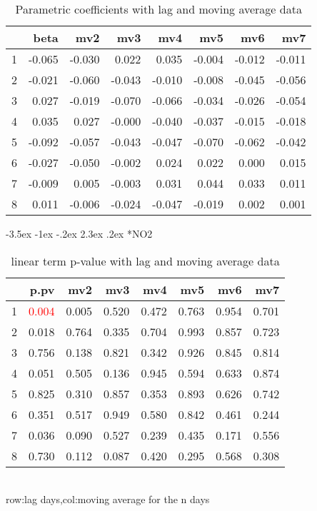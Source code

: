 \documentclass[a4paper, 12pt]{article}
\makeatletter
\def\large{\fontsize{14}{20}\selectfont}
\renewcommand\subsection{\@startsection {subsection}{1}{\z@}%
                                   {-3.5ex \@plus -1ex \@minus -.2ex}%
                                   {2.3ex \@plus.2ex}%
                                   {\centering\normalfont\large\bfseries}}
\makeatother
\begin{document}
\begin{table}[h]
\centering
\caption{Parametric coefficients with lag and moving average data}
\begin{tabular}{rrrrrrrr}
  \hline
 & beta & mv2 & mv3 & mv4 & mv5 & mv6 & mv7 \\
  \hline
1 & -0.065 & -0.030 & 0.022 & 0.035 & -0.004 & -0.012 & -0.011 \\
  2 & -0.021 & -0.060 & -0.043 & -0.010 & -0.008 & -0.045 & -0.056 \\
  3 & 0.027 & -0.019 & -0.070 & -0.066 & -0.034 & -0.026 & -0.054 \\
  4 & 0.035 & 0.027 & -0.000 & -0.040 & -0.037 & -0.015 & -0.018 \\
  5 & -0.092 & -0.057 & -0.043 & -0.047 & -0.070 & -0.062 & -0.042 \\
  6 & -0.027 & -0.050 & -0.002 & 0.024 & 0.022 & 0.000 & 0.015 \\
  7 & -0.009 & 0.005 & -0.003 & 0.031 & 0.044 & 0.033 & 0.011 \\
  8 & 0.011 & -0.006 & -0.024 & -0.047 & -0.019 & 0.002 & 0.001 \\
   \hline
\end{tabular}
\end{table}
\clearpage
\subsection*{NO2}
\begin{table}[h]
\centering
\caption{linear term p-value with lag and moving average data}
\begin{tabular}{rrrrrrrr}
  \hline
 & p.pv & mv2 & mv3 & mv4 & mv5 & mv6 & mv7 \\
  \hline
1 & \textcolor{red}{0.004} & 0.005 & 0.520 & 0.472 & 0.763 & 0.954 & 0.701 \\
  2 & 0.018 & 0.764 & 0.335 & 0.704 & 0.993 & 0.857 & 0.723 \\
  3 & 0.756 & 0.138 & 0.821 & 0.342 & 0.926 & 0.845 & 0.814 \\
  4 & 0.051 & 0.505 & 0.136 & 0.945 & 0.594 & 0.633 & 0.874 \\
  5 & 0.825 & 0.310 & 0.857 & 0.353 & 0.893 & 0.626 & 0.742 \\
  6 & 0.351 & 0.517 & 0.949 & 0.580 & 0.842 & 0.461 & 0.244 \\
  7 & 0.036 & 0.090 & 0.527 & 0.239 & 0.435 & 0.171 & 0.556 \\
  8 & 0.730 & 0.112 & 0.087 & 0.420 & 0.295 & 0.568 & 0.308 \\
   \hline
\end{tabular}
\\row:lag days,col:moving average for the n days
\end{table}
\end{document}
